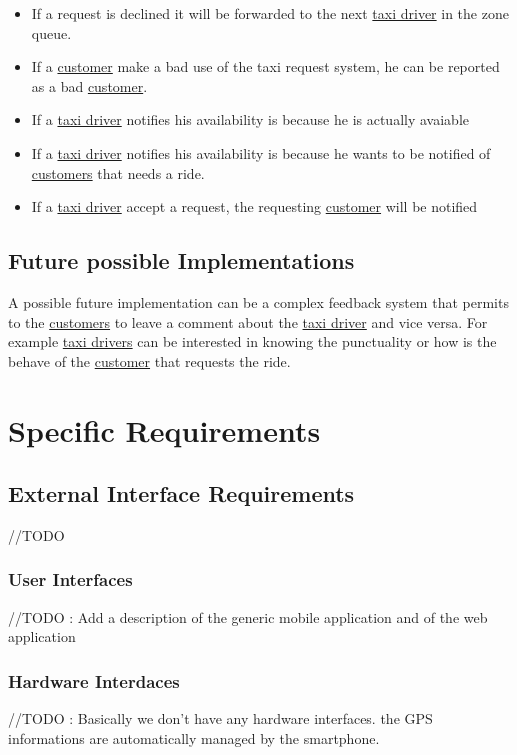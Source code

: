 \documentclass{report}
\begin{document}
\begin{itemize}
				\item If a request is declined it will be forwarded to the next \hyperref[sec:tdriver]{taxi driver} in the zone queue.

				\item If a \hyperref[sec:customer]{customer} make a bad use of the taxi request system, he can be reported as a bad \hyperref[sec:customer]{customer}.

				\item If a \hyperref[sec:tdriver]{taxi driver} notifies his availability is because he is actually avaiable

				\item If a \hyperref[sec:tdriver]{taxi driver} notifies his availability is because he wants to be notified of \hyperref[sec:customer]{customers} that needs a ride.

				\item If a \hyperref[sec:tdriver]{taxi driver} accept a request, the requesting \hyperref[sec:customer]{customer} will be notified
			\end{itemize}

	\section{Future possible Implementations}
	A possible future implementation can be a complex feedback system that permits to the \hyperref[sec:customer]{customers} to leave a comment about the \hyperref[sec:tdriver]{taxi driver} and vice versa.
	For example \hyperref[sec:tdriver]{taxi drivers} can be interested in knowing the punctuality or how is the behave of the \hyperref[sec:customer]{customer} that requests the ride.

\chapter{Specific Requirements}

	\section{External Interface Requirements}
	//TODO

		\subsection{User Interfaces}
		//TODO : Add a description of the generic mobile application and of the web application

		\subsection{Hardware Interdaces}
		//TODO : Basically we don't have any hardware interfaces. the GPS informations are automatically managed by the smartphone.
\end{document}
